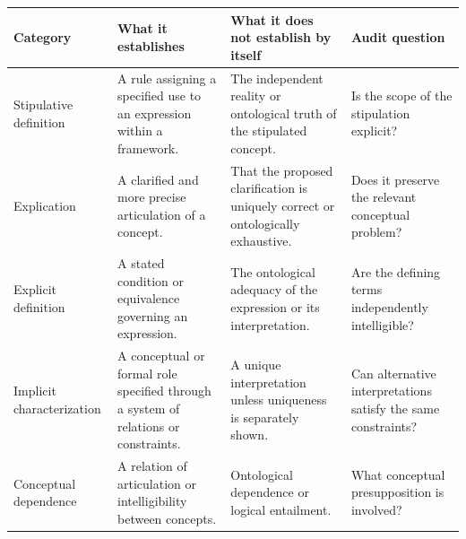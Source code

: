 
\begin{table}[htbp]
\centering
\small
\setlength{\tabcolsep}{5pt}
\renewcommand{\arraystretch}{1.35}
\begin{tabular}{|p{2.7cm}|p{4.0cm}|p{4.1cm}|p{3.0cm}|}
\hline
\textbf{Category} &
\textbf{What it establishes} &
\textbf{What it does not establish by itself} &
\textbf{Audit question} \\
\hline

Stipulative definition &
A rule assigning a specified use to an expression within a
framework. &
The independent reality or ontological truth of the stipulated
concept. &
Is the scope of the stipulation explicit? \\
\hline

Explication &
A clarified and more precise articulation of a concept. &
That the proposed clarification is uniquely correct or
ontologically exhaustive. &
Does it preserve the relevant conceptual problem? \\
\hline

Explicit definition &
A stated condition or equivalence governing an expression. &
The ontological adequacy of the expression or its interpretation. &
Are the defining terms independently intelligible? \\
\hline

Implicit characterization &
A conceptual or formal role specified through a system of
relations or constraints. &
A unique interpretation unless uniqueness is separately shown. &
Can alternative interpretations satisfy the same constraints? \\
\hline

Conceptual dependence &
A relation of articulation or intelligibility between concepts. &
Ontological dependence or logical entailment. &
What conceptual presupposition is involved? \\
\hline


\end{tabular}
\end{table}
